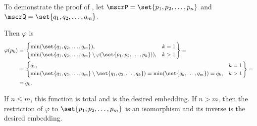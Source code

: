 \begin{example}\label{ex:thm:well_ordered_sets_can_be_embedded/proof}
  To demonstrate the proof of , let \( \mscrP = \set{ p_1, p_2, \ldots, p_n } \) and \( \mscrQ = \set{ q_1, q_2, \ldots, q_m } \).

  Then \( \varphi \) is
  \begin{align*}
    \varphi(p_k)
    &=
    \begin{rcases}
      \begin{cases}
        \min(\set{ q_1, q_2, \ldots, q_m }),                                                  &k = 1 \\
        \min(\set{ q_1, q_2, \ldots, q_m } \setminus \varphi(\set{ p_1, p_2, \ldots, p_k })), &k > 1
      \end{cases}
    \end{rcases}
    = \\ &=
    \begin{rcases}
      \begin{cases}
        q_1,                                                                                                                &k = 1 \\
        \min(\set{ q_1, q_2, \ldots, q_m } \setminus \set{ q_1, q_2, \ldots, q_k }) = \min(\set{ q_k, \ldots, q_m }) = q_k, &k > 1
      \end{cases}
    \end{rcases}
    = \\ &=
    q_k.
  \end{align*}

  If \( n \leq m \), this function is total and is the desired embedding. If \( n > m \), then the restriction of \( \varphi \) to \( \set{ p_1, p_2, \ldots, p_m } \) is an isomorphism and its inverse is the desired embedding.
\end{example}
